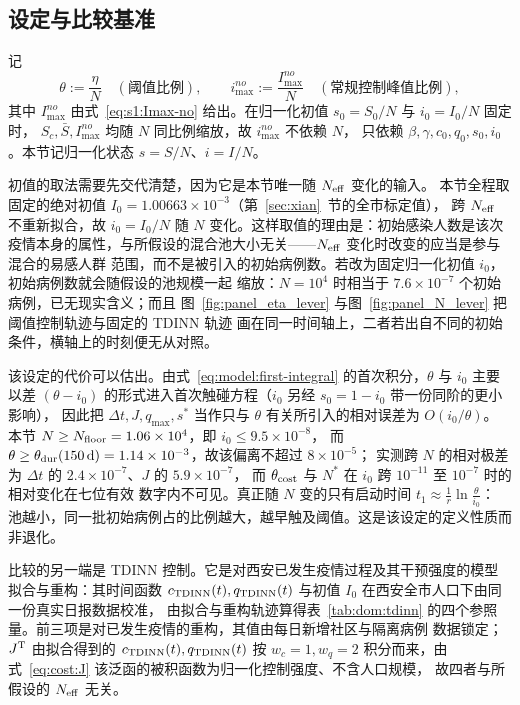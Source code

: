 \documentclass[lang=cn,a4paper,newtx]{elegantpaper}
\numberwithin{equation}{section}
\theoremstyle{plain}
\begin{document}
\subsection{设定与比较基准}
\label{sec:dom:setup}

记
\begin{equation}
  \theta:=\frac{\eta}{N}\quad(\text{阈值比例}),\qquad
  i_{\max}^{no}:=\frac{I_{\max}^{no}}{N}\quad(\text{常规控制峰值比例}),
  \label{eq:dom:ratios}
\end{equation}
其中 $I_{\max}^{no}$ 由式~\eqref{eq:s1:Imax-no} 给出。在归一化初值 $s_0=S_0/N$ 与 $i_0=I_0/N$ 固定时，
$S_c,\bar S,I_{\max}^{no}$ 均随 $N$ 同比例缩放，故 $i_{\max}^{no}$ 不依赖 $N$，
只依赖 $\beta,\gamma,c_0,q_0,s_0,i_0$。本节记归一化状态 $s=S/N$、$i=I/N$。

初值的取法需要先交代清楚，因为它是本节唯一随 $N_{\rm eff}$ 变化的输入。
本节全程取固定的绝对初值 $I_0=1.00663\times10^{-3}$（第~\ref{sec:xian}~节的全市标定值），
跨 $N_{\rm eff}$ 不重新拟合，故 $i_0=I_0/N$ 随 $N$ 变化。这样取值的理由是：初始感染人数是该次
疫情本身的属性，与所假设的混合池大小无关——$N_{\rm eff}$ 变化时改变的应当是参与混合的易感人群
范围，而不是被引入的初始病例数。若改为固定归一化初值 $i_0$，初始病例数就会随假设的池规模一起
缩放：$N=10^4$ 时相当于 $7.6\times10^{-7}$ 个初始病例，已无现实含义；而且
图~\ref{fig:panel_eta_lever} 与图~\ref{fig:panel_N_lever} 把阈值控制轨迹与固定的 TDINN 轨迹
画在同一时间轴上，二者若出自不同的初始条件，横轴上的时刻便无从对照。

该设定的代价可以估出。由式~\eqref{eq:model:first-integral} 的首次积分，$\theta$ 与 $i_0$ 主要以差
$(\theta-i_0)$ 的形式进入首次触碰方程（$i_0$ 另经 $s_0=1-i_0$ 带一份同阶的更小影响），
因此把 $\Delta t,J,q_{\max},s^\ast$ 当作只与 $\theta$ 有关所引入的相对误差为 $O(i_0/\theta)$。
本节 $N\ge N_{\rm floor}=1.06\times10^{4}$，即 $i_0\le9.5\times10^{-8}$，
而 $\theta\ge\theta_{\rm dur}(150\,\mathrm d)=1.14\times10^{-3}$，故该偏离不超过 $8\times10^{-5}$；
实测跨 $N$ 的相对极差为 $\Delta t$ 的 $2.4\times10^{-7}$、$J$ 的 $5.9\times10^{-7}$，
而 $\theta_{\rm cost}$ 与 $N^\ast$ 在 $i_0$ 跨 $10^{-11}$ 至 $10^{-7}$ 时的相对变化在七位有效
数字内不可见。真正随 $N$ 变的只有启动时间 $t_1\approx\frac{1}{r}\ln\frac{\theta}{i_0}$：
池越小，同一批初始病例占的比例越大，越早触及阈值。这是该设定的定义性质而非退化。

比较的另一端是 TDINN 控制。它是对西安已发生疫情过程及其干预强度的模型拟合与重构：其时间函数
$c_{\rm TDINN}(t),q_{\rm TDINN}(t)$ 与初值 $I_0$ 在西安全市人口下由同一份真实日报数据校准，
由拟合与重构轨迹算得表~\ref{tab:dom:tdinn} 的四个参照量。前三项是对已发生疫情的重构，其值由每日新增社区与隔离病例
数据锁定；$J^{\rm T}$ 由拟合得到的 $c_{\rm TDINN}(t),q_{\rm TDINN}(t)$ 按 $w_c=1,w_q=2$
积分而来，由式~\eqref{eq:cost:J} 该泛函的被积函数为归一化控制强度、不含人口规模，
故四者与所假设的 $N_{\rm eff}$ 无关。
\end{document}
